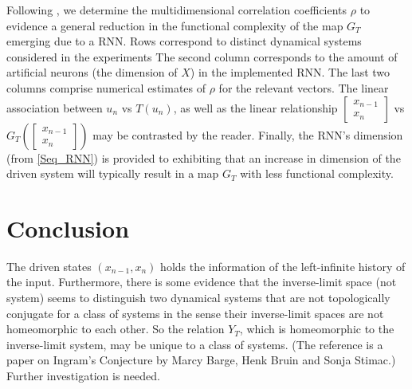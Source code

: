\documentclass[a4paper,12pt,twoside]{report}
\begin{document}
\begin{center}
\begin{table}
      \caption{Following \cite{manjunath2021universal}, we determine the multidimensional correlation coefficients $\rho$ to evidence a general reduction in the functional complexity of the map $G_T$ emerging due to a RNN. Rows correspond to distinct dynamical systems considered in the experiments
      The second column corresponds to the amount of artificial neurons (the dimension of $X$) in the implemented RNN.
      The last two columns comprise numerical estimates of $\rho$ for the relevant vectors. The linear association between $u_n$ vs $T(u_{n})$, as well as the linear relationship $\begin{bmatrix}
              x_{n-1}\\
              x_n
          \end{bmatrix}$ vs $G_T \left( \begin{bmatrix}
              x_{n-1}\\
              x_n
          \end{bmatrix}\right)$ may be contrasted by the reader. 
          Finally, the RNN's dimension (from \eqref{Seq_RNN}) is provided to exhibiting that an increase in dimension of the driven system will 
          typically result in a map $G_T$ with less functional complexity.} 
          \label{Table_FC}
      \end{table}\label{tbl_attractorsPearson}
\end{center}
  

\chapter{Conclusion}\label{ch6}

The driven states $(x_{n-1},x_n)$ holds the information of the left-infinite history of the input. Furthermore, there is some evidence that the inverse-limit space (not system) seems to distinguish two dynamical systems that are not topologically conjugate for a class of systems in the sense their inverse-limit spaces are not homeomorphic to each other.  So the relation $Y_T$, which is homeomorphic to the inverse-limit system, may be unique to a class of systems. (The reference is a paper on Ingram’s Conjecture by Marcy Barge, Henk Bruin and Sonja Stimac.) Further investigation is needed. 
\end{document}

